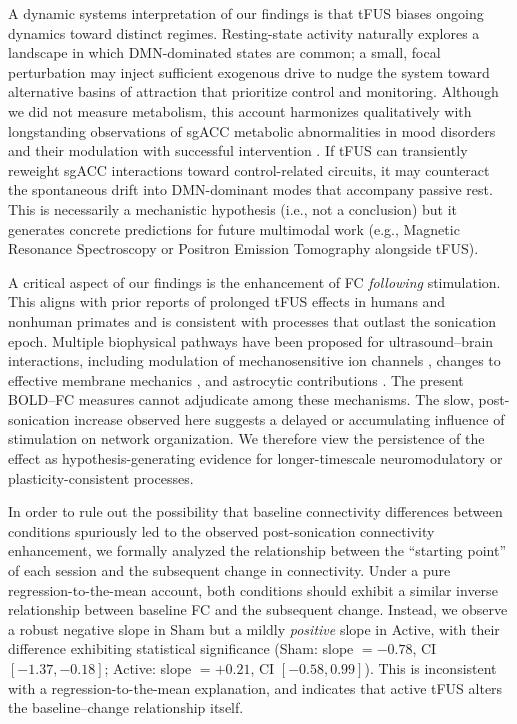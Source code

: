 A dynamic systems interpretation of our findings is that tFUS biases ongoing dynamics toward distinct regimes. Resting-state activity naturally explores a landscape in which DMN-dominated states are common; a small, focal perturbation may inject sufficient exogenous drive to nudge the system toward alternative basins of attraction that prioritize control and monitoring. Although we did not measure metabolism, this account harmonizes qualitatively with longstanding observations of sgACC metabolic abnormalities in mood disorders and their modulation with successful intervention \cite{Mayberg2005,Drevets2008}. If tFUS can transiently reweight sgACC interactions toward control-related circuits, it may counteract the spontaneous drift into DMN-dominant modes that accompany passive rest. This is necessarily a mechanistic hypothesis (i.e., not a conclusion) but it generates concrete predictions for future multimodal work (e.g., Magnetic Resonance Spectroscopy or Positron Emission Tomography alongside tFUS). 

A critical aspect of our findings is the enhancement of FC \emph{following} stimulation. This aligns with prior reports of prolonged tFUS effects in humans and nonhuman primates \cite{Verhagen2019-ae,zhang2023excitatory,yaakub2023transcranial} and is consistent with processes that outlast the sonication epoch. Multiple biophysical pathways have been proposed for ultrasound–brain interactions, including modulation of mechanosensitive ion channels \cite{kubanek2016ultrasound}, changes to effective membrane mechanics \cite{krasovitski2011intramembrane}, and astrocytic contributions \cite{yang2015enhancement}. The present BOLD–FC measures cannot adjudicate among these mechanisms. The slow, post-sonication increase observed here suggests a delayed or accumulating influence of stimulation on network organization. We therefore view the persistence of the effect as hypothesis-generating evidence for longer-timescale neuromodulatory or plasticity-consistent processes. 

In order to rule out the possibility that baseline connectivity differences between conditions spuriously led to the observed post-sonication connectivity enhancement, we formally analyzed the relationship between the ``starting point'' of each session and the subsequent change in connectivity.  Under a pure regression-to-the-mean account, both conditions should exhibit a similar inverse relationship between baseline FC and the subsequent change. Instead, we observe a robust negative slope in Sham but a mildly \emph{positive} slope in Active, with their difference exhibiting statistical significance (Sham: slope $=-0.78$, CI $[-1.37, -0.18]$; Active: slope $=+0.21$, CI $[-0.58, 0.99]$). This is inconsistent with a regression-to-the-mean explanation, and indicates that  active tFUS alters the baseline--change relationship itself. 


